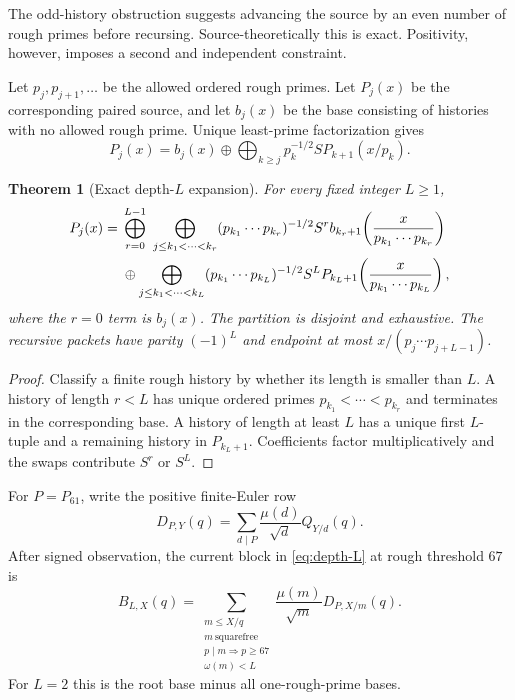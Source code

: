 \documentclass[11pt]{article}
\newtheorem{theorem}{Theorem}[section]
\newcommand{\1}{\mathbf 1}
\begin{document}
The odd-history obstruction suggests advancing the source by an even number of
rough primes before recursing.  Source-theoretically this is exact.  Positivity,
however, imposes a second and independent constraint.

Let $p_j,p_{j+1},\ldots$ be the allowed ordered rough primes.  Let $P_j(x)$ be
the corresponding paired source, and let $b_j(x)$ be the base consisting of
histories with no allowed rough prime.  Unique least-prime factorization gives
\begin{equation}
 P_j(x)=b_j(x)\oplus
 \bigoplus_{k\ge j}p_k^{-1/2}S P_{k+1}(x/p_k).
 \label{eq:one-level}
\end{equation}

\begin{theorem}[Exact depth-$L$ expansion]
\label{thm:depth-L}
For every fixed integer $L\ge1$,
\begin{align}
 P_j(x)={}&
 \bigoplus_{r=0}^{L-1}
 \ \bigoplus_{j\le k_1<\cdots<k_r}
 (p_{k_1}\cdots p_{k_r})^{-1/2}S^r
 b_{k_r+1}\!\left(\frac{x}{p_{k_1}\cdots p_{k_r}}\right)
 \notag\\
 &\oplus
 \bigoplus_{j\le k_1<\cdots<k_L}
 (p_{k_1}\cdots p_{k_L})^{-1/2}S^L
 P_{k_L+1}\!\left(\frac{x}{p_{k_1}\cdots p_{k_L}}\right),
 \label{eq:depth-L}
\end{align}
where the $r=0$ term is $b_j(x)$.  The partition is disjoint and exhaustive.
The recursive packets have parity $(-1)^L$ and endpoint at most
$x/(p_j\cdots p_{j+L-1})$.
\end{theorem}

\begin{proof}
Classify a finite rough history by whether its length is smaller than $L$.  A
history of length $r<L$ has unique ordered primes $p_{k_1}<\cdots<p_{k_r}$ and
terminates in the corresponding base.  A history of length at least $L$ has a
unique first $L$-tuple and a remaining history in $P_{k_L+1}$.  Coefficients
factor multiplicatively and the swaps contribute $S^r$ or $S^L$.
\end{proof}

For $P=P_{61}$, write the positive finite-Euler row
\begin{equation}
 D_{P,Y}(q)=\sum_{d\mid P}\frac{\mu(d)}{\sqrt d}Q_{Y/d}(q).
 \label{eq:finite-euler-row}
\end{equation}
After signed observation, the current block in \eqref{eq:depth-L} at rough
threshold $67$ is
\begin{equation}
 B_{L,X}(q)=
 \sum_{\substack{m\le X/q\\m\ \mathrm{squarefree}\\
                   p\mid m\Rightarrow p\ge67\\\omega(m)<L}}
 \frac{\mu(m)}{\sqrt m}D_{P,X/m}(q).
 \label{eq:fixed-depth-current}
\end{equation}
For $L=2$ this is the root base minus all one-rough-prime bases.
\end{document}
